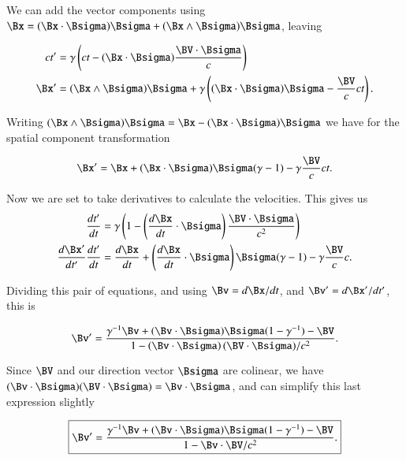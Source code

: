 We can add the vector components using $\Bx = (\Bx \cdot \Bsigma) \Bsigma + (\Bx \wedge \Bsigma) \Bsigma$, leaving

\begin{subequations}
\begin{align}\label{eqn:relativisticElectrodynamicsA1:210}
c t' &= \gamma \left( ct - (\Bx \cdot \Bsigma) \frac{\BV \cdot \Bsigma}{c} \right) \\
\Bx' &= (\Bx \wedge \Bsigma) \Bsigma + \gamma \left( (\Bx \cdot \Bsigma) \Bsigma - \frac{\BV}{c} c t \right) .
\end{align}
\end{subequations}

Writing $(\Bx \wedge \Bsigma) \Bsigma = \Bx - (\Bx \cdot \Bsigma)\Bsigma$ we have for the spatial component transformation

\begin{equation}\label{eqn:relativisticElectrodynamicsA1:220}
\Bx' = \Bx + (\Bx \cdot \Bsigma) \Bsigma (\gamma - 1) - \gamma \frac{\BV}{c} c t.
\end{equation}

Now we are set to take derivatives to calculate the velocities.  This gives us
\begin{subequations}
\begin{align}\label{eqn:relativisticElectrodynamicsA1:230}
\frac{dt'}{dt} &= \gamma \left( 1 - \left( \frac{d\Bx}{dt} \cdot \Bsigma \right) \frac{\BV \cdot \Bsigma}{c^2} \right) \\
\frac{d\Bx'}{dt'} \frac{d t'}{dt} &= \frac{d\Bx}{dt} + \left(\frac{d\Bx}{dt} \cdot \Bsigma\right) \Bsigma (\gamma - 1) - \gamma \frac{\BV}{c} c .
\end{align}
\end{subequations}

Dividing this pair of equations, and using $\Bv = d\Bx/dt$, and $\Bv' = d\Bx'/dt'$, this is

\begin{equation}\label{eqn:relativisticElectrodynamicsA1:240}
\Bv' = \frac{\gamma^{-1} \Bv + (\Bv \cdot \Bsigma) \Bsigma (1 - \gamma^{-1}) - \BV}{ 1 - \left( \Bv \cdot \Bsigma \right) (\BV \cdot \Bsigma)/c^2 }.
\end{equation}

Since $\BV$ and our direction vector $\Bsigma$ are colinear, we have $(\Bv \cdot \Bsigma) (\BV \cdot \Bsigma) = \Bv \cdot \Bsigma$, and can simplify this last expression slightly

\begin{equation}\label{eqn:relativisticElectrodynamicsA1:250}
\boxed{
\Bv' = \frac{\gamma^{-1} \Bv + (\Bv \cdot \Bsigma) \Bsigma (1 - \gamma^{-1}) - \BV}{ 1 - \Bv \cdot \BV/c^2 }.
}
\end{equation}

